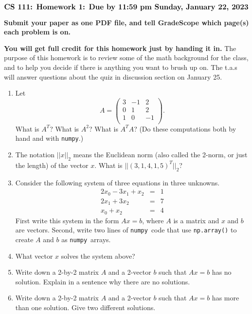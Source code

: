 \documentclass[11pt]{article}
\newcommand{\numpy}{{\tt numpy}}            %
\begin{document}
$$\mbox{\Large \bf CS 111: Homework 1: Due by 11:59 pm Sunday, January 22, 2023}$$
\par\smallskip\noindent
{\bf Submit your paper as one PDF file,
and tell GradeScope which page(s) each problem is on.}

\par\medskip\noindent
{\bf You will get full credit for this homework just by handing it in.}
The purpose of this homework is to review some of the math background
for the class, and to help you decide if there is anything you want to 
brush up on.  The t.a.s will answer questions about the quiz in discussion 
section on January 25.


\begin{enumerate}

\item
Let
$$ A = \left(
\begin{array}{ccc}
3 & -1 & 2 \\ 	
0 & 1 & 2 \\ 
1 & 0 & -1 \\
\end{array} 
\right). $$
What is $A^T$?  What is $A^2$?  What is $A^TA$?
(Do these computations both by hand and with \numpy.)

\item
The notation $||x||_2$ means the Euclidean norm (also called the 2-norm,
or just the length) of the vector $x$.  
What is $||(3, 1, 4, 1, 5)^T||_2$?

\item
Consider the following system of three equations in three unknowns.
\begin{eqnarray}
 2x_0 - 3x_1 + x_2  & =  & 1 \\
 2x_1 + 3x_2  & =  & 7 \\
 x_0 + x_2  & = & 4 
\end{eqnarray}
First write this system in the form $Ax=b$, 
where $A$ is a matrix and $x$ and $b$ are vectors. 
Second, write two lines of \numpy\ code that use {\tt np.array()} to
create $A$ and $b$ as \numpy\ arrays.

\item
What vector $x$ solves the system above? 

\item
Write down a 2-by-2 matrix $A$ and a 2-vector $b$ such that $Ax=b$ has no 
solution.  Explain in a sentence why there are no solutions.

\item
Write down a 2-by-2 matrix $A$ and a 2-vector $b$ such that $Ax=b$ has 
more than one solution.  Give two different solutions.


\end{enumerate}
\end{document}
